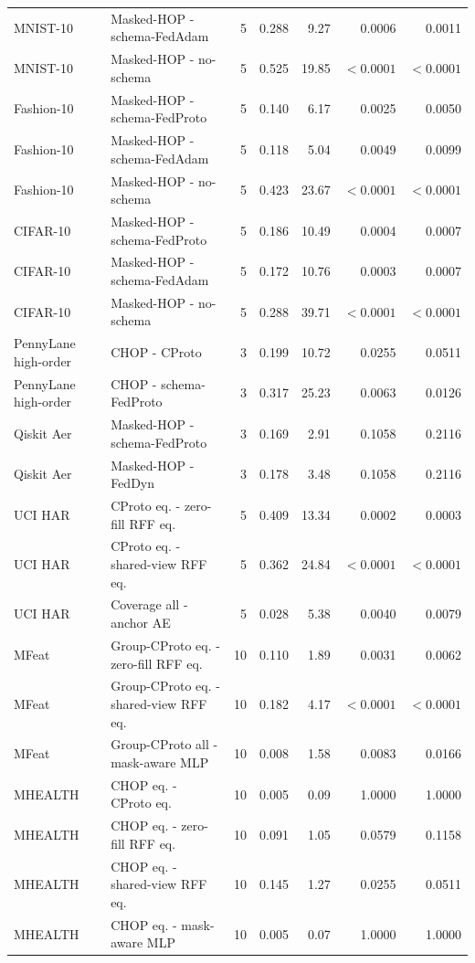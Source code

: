 \begin{table}[t]
{\begin{tabular}{llrrrrr}
MNIST-10 & Masked-HOP - schema-FedAdam & 5 & 0.288 & 9.27 & 0.0006 & 0.0011 \\
MNIST-10 & Masked-HOP - no-schema & 5 & 0.525 & 19.85 & \(<0.0001\) & \(<0.0001\) \\
Fashion-10 & Masked-HOP - schema-FedProto & 5 & 0.140 & 6.17 & 0.0025 & 0.0050 \\
Fashion-10 & Masked-HOP - schema-FedAdam & 5 & 0.118 & 5.04 & 0.0049 & 0.0099 \\
Fashion-10 & Masked-HOP - no-schema & 5 & 0.423 & 23.67 & \(<0.0001\) & \(<0.0001\) \\
CIFAR-10 & Masked-HOP - schema-FedProto & 5 & 0.186 & 10.49 & 0.0004 & 0.0007 \\
CIFAR-10 & Masked-HOP - schema-FedAdam & 5 & 0.172 & 10.76 & 0.0003 & 0.0007 \\
CIFAR-10 & Masked-HOP - no-schema & 5 & 0.288 & 39.71 & \(<0.0001\) & \(<0.0001\) \\
PennyLane high-order & CHOP - CProto & 3 & 0.199 & 10.72 & 0.0255 & 0.0511 \\
PennyLane high-order & CHOP - schema-FedProto & 3 & 0.317 & 25.23 & 0.0063 & 0.0126 \\
Qiskit Aer & Masked-HOP - schema-FedProto & 3 & 0.169 & 2.91 & 0.1058 & 0.2116 \\
Qiskit Aer & Masked-HOP - FedDyn & 3 & 0.178 & 3.48 & 0.1058 & 0.2116 \\
UCI HAR & CProto eq. - zero-fill RFF eq. & 5 & 0.409 & 13.34 & 0.0002 & 0.0003 \\
UCI HAR & CProto eq. - shared-view RFF eq. & 5 & 0.362 & 24.84 & \(<0.0001\) & \(<0.0001\) \\
UCI HAR & Coverage all - anchor AE & 5 & 0.028 & 5.38 & 0.0040 & 0.0079 \\
MFeat & Group-CProto eq. - zero-fill RFF eq. & 10 & 0.110 & 1.89 & 0.0031 & 0.0062 \\
MFeat & Group-CProto eq. - shared-view RFF eq. & 10 & 0.182 & 4.17 & \(<0.0001\) & \(<0.0001\) \\
MFeat & Group-CProto all - mask-aware MLP & 10 & 0.008 & 1.58 & 0.0083 & 0.0166 \\
MHEALTH & CHOP eq. - CProto eq. & 10 & 0.005 & 0.09 & 1.0000 & 1.0000 \\
MHEALTH & CHOP eq. - zero-fill RFF eq. & 10 & 0.091 & 1.05 & 0.0579 & 0.1158 \\
MHEALTH & CHOP eq. - shared-view RFF eq. & 10 & 0.145 & 1.27 & 0.0255 & 0.0511 \\
MHEALTH & CHOP eq. - mask-aware MLP & 10 & 0.005 & 0.07 & 1.0000 & 1.0000 \\

\end{tabular}}
\end{table}
